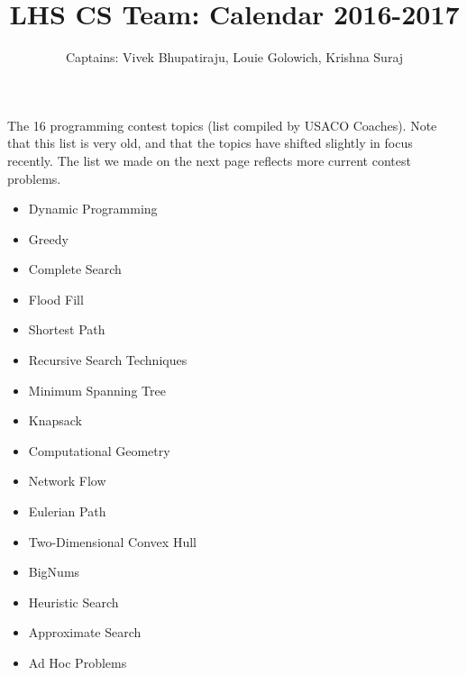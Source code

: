 \documentclass[11pt, oneside]{article}   	%
\title{LHS CS Team: Calendar 2016-2017}
\author{Captains: Vivek Bhupatiraju, Louie Golowich, Krishna Suraj}
\begin{document}
\maketitle

The 16 programming contest topics (list compiled by USACO Coaches). Note that this list is very old, and that the topics have shifted slightly in focus recently. The list we made on the next page reflects more current contest problems.
\begin{itemize}
\item Dynamic Programming
\item Greedy
\item Complete Search
\item Flood Fill
\item Shortest Path
\item Recursive Search Techniques
\item Minimum Spanning Tree
\item Knapsack
\item Computational Geometry
\item Network Flow
\item Eulerian Path
\item Two-Dimensional Convex Hull
\item BigNums
\item Heuristic Search
\item Approximate Search
\item Ad Hoc Problems
\end{itemize}

\newpage
\end{document}
